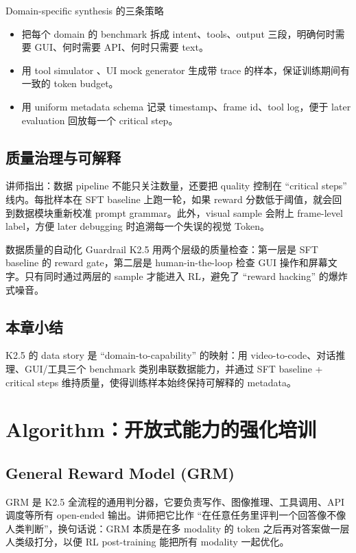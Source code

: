\documentclass[a4paper]{article}
\begin{document}
\begin{knowledgebox}{Domain-specific synthesis 的三条策略}
\begin{itemize}
    \item 把每个 domain 的 benchmark 拆成 intent、tools、output 三段，明确何时需要 GUI、何时需要 API、何时只需要 text。
    \item 用 tool simulator 、UI mock generator 生成带 trace 的样本，保证训练期间有一致的 token budget。
    \item 用 uniform metadata schema 记录 timestamp、frame id、tool log，便于 later evaluation 回放每一个 critical step。
\end{itemize}
\end{knowledgebox}

\subsection{质量治理与可解释}
讲师指出：数据 pipeline 不能只关注数量，还要把 quality 控制在 ``critical steps'' 线内。每批样本在 SFT baseline 上跑一轮，如果 reward 分数低于阈值，就会回到数据模块重新校准 prompt grammar。此外，visual sample 会附上 frame-level label，方便 later debugging 时追溯每一个失误的视觉 Token。

\begin{importantbox}{数据质量的自动化 Guardrail}
K2.5 用两个层级的质量检查：第一层是 SFT baseline 的 reward gate，第二层是 human-in-the-loop 检查 GUI 操作和屏幕文字。只有同时通过两层的 sample 才能进入 RL，避免了 ``reward hacking'' 的爆炸式噪音。
\end{importantbox}

\subsection{本章小结}
K2.5 的 data story 是 ``domain-to-capability'' 的映射：用 video-to-code、对话推理、GUI/工具三个 benchmark 类别串联数据能力，并通过 SFT baseline + critical steps 维持质量，使得训练样本始终保持可解释的 metadata。
\section{Algorithm：开放式能力的强化培训}

\subsection{General Reward Model (GRM)}
GRM 是 K2.5 全流程的通用判分器，它要负责写作、图像推理、工具调用、API 调度等所有 open-ended 输出。讲师把它比作 ``在任意任务里评判一个回答像不像人类判断''，换句话说：GRM 本质是在多 modality 的 token 之后再对答案做一层人类级打分，以便 RL post-training 能把所有 modality 一起优化。
\end{document}
